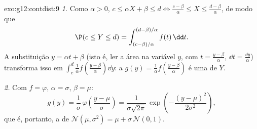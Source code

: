 \begin{solution}{exo:g12:contdist:9}
\emph{1.} Como $\alpha > 0$, $c \leq \alpha X + \beta \leq d
\iff \frac{c - \beta}{\alpha} \leq X \leq \frac{d - \beta}{\alpha}$, de
modo que
\[
\P(c \leq Y \leq d)
= \int_{(c-\beta)/\alpha}^{(d-\beta)/\alpha} f(t)\,\dd t .
\]
A substituição $y = \alpha t + \beta$ (isto é, ler a área na variável
$y$, com $t = \frac{y - \beta}{\alpha}$, $\dd t = \frac{\dd y}{\alpha}$)
transforma isso em
$\int_c^d \frac{1}{\alpha} f\left(\frac{y-\beta}{\alpha}\right)\dd y$: a
 $g(y) = \frac1\alpha f\left(\frac{y-\beta}{\alpha}\right)$ é uma
 de $Y$.

\emph{2.} Com $f = \varphi$, $\alpha = \sigma$, $\beta = \mu$:
\[
g(y) = \frac{1}{\sigma}\,\varphi\!\left(\frac{y - \mu}{\sigma}\right)
= \frac{1}{\sigma\sqrt{2\pi}}\,
\exp\left(-\frac{(y-\mu)^2}{2\sigma^2}\right),
\]
que é, portanto, a  de
$\mathcal N(\mu, \sigma^2) = \mu + \sigma\,\mathcal N(0,1)$.
\end{solution}

